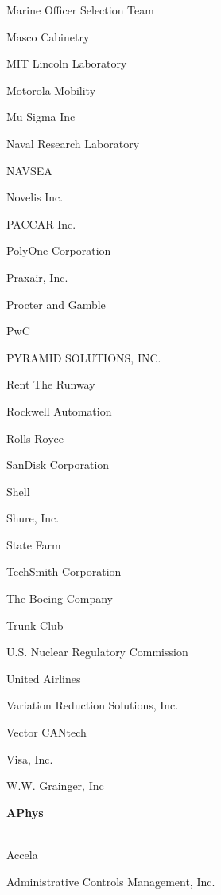 \documentclass[twoside]{article}
\begin{document}
\begin{center}
\begin{multicols}{5}
\begin{FlushLeft}
\begin{compactitem}
\item Marine Officer Selection Team
\item Masco Cabinetry
\item MIT Lincoln Laboratory
\item Motorola Mobility
\item Mu Sigma Inc
\item Naval Research Laboratory
\item NAVSEA
\item Novelis Inc.
\item PACCAR Inc.
\item PolyOne Corporation
\item Praxair, Inc.
\item Procter and Gamble
\item PwC
\item PYRAMID SOLUTIONS, INC.
\item Rent The Runway
\item Rockwell Automation
\item Rolls-Royce
\item SanDisk Corporation
\item Shell
\item Shure, Inc.
\item State Farm
\item TechSmith Corporation
\item The Boeing Company
\item Trunk Club
\item U.S. Nuclear Regulatory Commission
\item United Airlines
\item Variation Reduction Solutions, Inc.
\item Vector CANtech
\item Visa, Inc.
\item W.W. Grainger, Inc
\end{compactitem}
        \end{FlushLeft}
        \vspace{1em}
        {\fontsize{14}{16}\selectfont \bf APhys}\\
        \vspace{-1em}
        ~\hrulefill~
        \vspace{-.9em}
        \begin{FlushLeft}
        \begin{compactitem}
        \item Accela
\item Administrative Controls Management, Inc.

\end{compactitem}
\end{FlushLeft}
\end{multicols}
\end{center}
\end{document}
